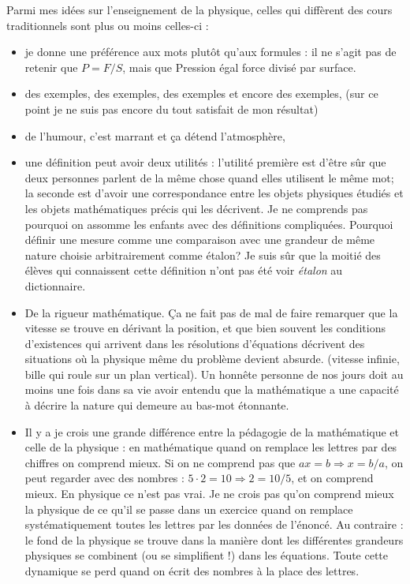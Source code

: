 \documentclass[a4paper,12pt]{book}
\theoremstyle{mes_exemples}	\newtheorem{exemple}[numtho]{Exemple}
\theoremstyle{mes_tho}
\begin{document}
Parmi mes idées sur l'enseignement de la physique, celles qui diffèrent des cours \og traditionnels\fg{} sont plus ou moins celles-ci :
\begin{itemize}
\item je donne une préférence aux mots plutôt qu'aux formules : il ne s'agit pas de retenir que $P=F/S$, mais que \og Pression égal force divisé par surface\fg.
\item des exemples, des exemples, des exemples et encore des exemples, (sur ce point je ne suis pas encore du tout satisfait de mon résultat)
\item de l'humour, c'est marrant et ça détend l'atmosphère,
\item une définition peut avoir deux utilités : l'utilité première est d'être sûr que deux personnes parlent de la même chose quand elles utilisent le même mot; la seconde est d'avoir une correspondance entre les objets physiques étudiés et les objets mathématiques précis qui les décrivent. Je ne comprends pas pourquoi on assomme les enfants avec des définitions compliquées. Pourquoi définir une \og mesure\fg{} comme une \og comparaison avec une grandeur de même nature choisie arbitrairement comme étalon\fg ? Je suis sûr que la moitié des élèves qui connaissent cette définition n'ont pas été voir \emph{étalon} au dictionnaire.
\item De la rigueur mathématique. Ça ne fait pas de mal de faire remarquer que la vitesse se trouve en dérivant la position, et que bien souvent les conditions d'existences qui arrivent dans les résolutions d'équations décrivent des situations où la physique même du problème devient absurde. (vitesse infinie, bille qui roule sur un plan vertical). Un honnête personne de nos jours doit au moins une fois dans sa vie avoir entendu que la mathématique a une capacité à décrire la nature qui demeure au bas-mot étonnante.
\item Il y a je crois une grande différence entre la pédagogie de la mathématique et celle de la physique : en mathématique quand on remplace les lettres par des chiffres on comprend mieux. Si on ne comprend pas que $ax=b\Rightarrow x=b/a$, on peut regarder avec des nombres : $5\cdot 2=10\Rightarrow 2=10/5$, et on comprend mieux. En physique ce n'est pas vrai. Je ne crois pas qu'on comprend mieux la physique de ce qu'il se passe dans un exercice quand on remplace systématiquement toutes les lettres par les données de l'énoncé. Au contraire : le fond de la physique se trouve dans la manière dont les différentes grandeurs physiques se combinent (ou se simplifient !) dans les équations. Toute cette dynamique se perd quand on écrit des nombres à la place des lettres.

\end{itemize}
\end{document}
